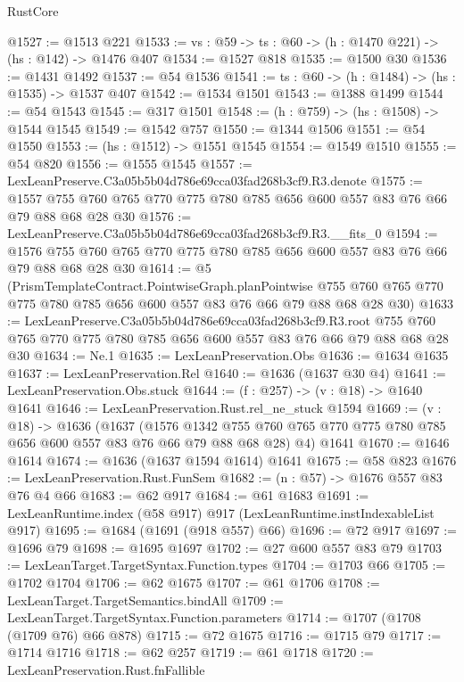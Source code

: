 \begin{lexlean}{RustCore}
\begin{coremodule}
@1527 := @1513 @221
@1533 := {vs : @59} -> {ts : @60} -> (h : @1470 @221) -> (hs : @142) -> @1476 @407
@1534 := @1527 @818
@1535 := @1500 @30
@1536 := @1431 @1492
@1537 := @54 @1536
@1541 := {ts : @60} -> (h : @1484) -> (hs : @1535) -> @1537 @407
@1542 := @1534 @1501
@1543 := @1388 @1499
@1544 := @54 @1543
@1545 := @317 @1501
@1548 := (h : @759) -> (hs : @1508) -> @1544 @1545
@1549 := @1542 @757
@1550 := @1344 @1506
@1551 := @54 @1550
@1553 := (hs : @1512) -> @1551 @1545
@1554 := @1549 @1510
@1555 := @54 @820
@1556 := @1555 @1545
@1557 := LexLeanPreserve.C3a05b5b04d786e69cca03fad268b3cf9.R3.denote
@1575 := @1557 @755 @760 @765 @770 @775 @780 @785 @656 @600 @557 @83 @76 @66 @79 @88 @68 @28 @30
@1576 := LexLeanPreserve.C3a05b5b04d786e69cca03fad268b3cf9.R3.__fits_0
@1594 := @1576 @755 @760 @765 @770 @775 @780 @785 @656 @600 @557 @83 @76 @66 @79 @88 @68 @28 @30
@1614 := @5
    (PrismTemplateContract.PointwiseGraph.planPointwise
      @755
      @760
      @765
      @770
      @775
      @780
      @785
      @656
      @600
      @557
      @83
      @76
      @66
      @79
      @88
      @68
      @28
      @30)
@1633 := LexLeanPreserve.C3a05b5b04d786e69cca03fad268b3cf9.R3.root
    @755
    @760
    @765
    @770
    @775
    @780
    @785
    @656
    @600
    @557
    @83
    @76
    @66
    @79
    @88
    @68
    @28
    @30
@1634 := Ne.{1}
@1635 := LexLeanPreservation.Obs
@1636 := @1634 @1635
@1637 := LexLeanPreservation.Rel
@1640 := @1636 (@1637 @30 @4)
@1641 := LexLeanPreservation.Obs.stuck
@1644 := (f : @257) -> (v : @18) -> @1640 @1641
@1646 := LexLeanPreservation.Rust.rel_ne_stuck @1594
@1669 := (v : @18) ->
  @1636
    (@1637
      (@1576 @1342 @755 @760 @765 @770 @775 @780 @785 @656 @600 @557 @83 @76 @66 @79 @88 @68 @28)
      @4)
    @1641
@1670 := @1646 @1614
@1674 := @1636 (@1637 @1594 @1614) @1641
@1675 := @58 @823
@1676 := LexLeanPreservation.Rust.FunSem
@1682 := (n : @57) -> @1676 @557 @83 @76 @4 @66
@1683 := @62 @917
@1684 := @61 @1683
@1691 := LexLeanRuntime.index (@58 @917) @917 (LexLeanRuntime.instIndexableList @917)
@1695 := @1684 (@1691 (@918 @557) @66)
@1696 := @72 @917
@1697 := @1696 @79
@1698 := @1695 @1697
@1702 := @27 @600 @557 @83 @79
@1703 := LexLeanTarget.TargetSyntax.Function.types
@1704 := @1703 @66
@1705 := @1702 @1704
@1706 := @62 @1675
@1707 := @61 @1706
@1708 := LexLeanTarget.TargetSemantics.bindAll
@1709 := LexLeanTarget.TargetSyntax.Function.parameters
@1714 := @1707 (@1708 (@1709 @76) @66 @878)
@1715 := @72 @1675
@1716 := @1715 @79
@1717 := @1714 @1716
@1718 := @62 @257
@1719 := @61 @1718
@1720 := LexLeanPreservation.Rust.fnFallible

\end{coremodule}
\end{lexlean}
